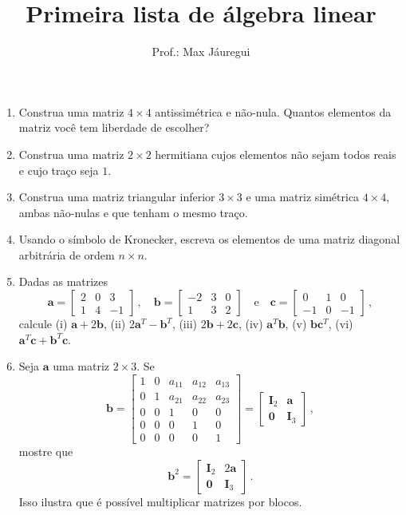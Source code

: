 \documentclass[12pt,a4paper]{article}
\title{Primeira lista de álgebra linear}
\author{Prof.: Max Jáuregui}
\date{}
\newcommand{\mb}{\mathbf}
\begin{document}
\maketitle
\begin{enumerate}
  \item Construa uma matriz $4\times4$ antissimétrica e não-nula. Quantos elementos da matriz você tem liberdade de escolher?
  \item Construa uma matriz $2\times 2$ hermitiana cujos elementos não sejam todos reais e cujo traço seja $1$.
  \item Construa uma matriz triangular inferior $3\times 3$ e uma matriz simétrica $4\times 4$, ambas não-nulas e que tenham o mesmo traço.
  \item Usando o símbolo de Kronecker, escreva os elementos de uma matriz diagonal arbitrária de ordem $n\times n$.
  \item Dadas as matrizes
  $$\mb a=\begin{bmatrix}
    2&0&3\\
    1&4&-1
  \end{bmatrix}\,,\quad \mb b=\begin{bmatrix}
    -2&3&0\\
    1&3&2
  \end{bmatrix}\quad\text{e}\quad \mb c=\begin{bmatrix}
    0&1&0\\
    -1&0&-1
  \end{bmatrix}\,,$$
  calcule (i) $\mb a+2\mb b$, (ii) $2\mb a^T-\mb b^T$, (iii) $2\mb b+2\mb c$, (iv) $\mb a^T\mb b$, (v) $\mb b\mb c^T$, (vi) $\mb a^T\mb c+\mb b^T\mb c$.
  \item Seja $\mb a$ uma matriz $2\times 3$. Se
  $$\mb b=\begin{bmatrix}
    1&0&a_{11}&a_{12}&a_{13}\\
    0&1&a_{21}&a_{22}&a_{23}\\
    0&0&1&0&0\\
    0&0&0&1&0\\
    0&0&0&0&1
  \end{bmatrix}=\begin{bmatrix}
    \mb I_2&\mb a\\
    \mb 0&\mb I_3
  \end{bmatrix}\,,$$
  mostre que
  $$\mb b^2=\begin{bmatrix}
    \mb I_2&2\mb a\\
    \mb 0&\mb I_3
  \end{bmatrix}\,.$$
  Isso ilustra que é possível multiplicar matrizes por blocos.

\end{enumerate}
\end{document}
